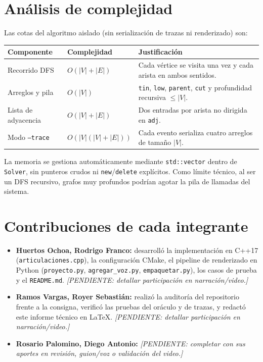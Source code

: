 \documentclass[11pt,a4paper]{article}
\begin{document}
\section{Análisis de complejidad}
Las cotas del algoritmo aislado (sin serialización de trazas ni renderizado) son:

\begin{center}
\begin{tabular}{@{}lll@{}}
\toprule
Componente & Complejidad & Justificación \\
\midrule
Recorrido DFS & $O(|V| + |E|)$ & Cada vértice se visita una vez y cada arista en ambos sentidos. \\
Arreglos y pila & $O(|V|)$ & \texttt{tin}, \texttt{low}, \texttt{parent}, \texttt{cut} y profundidad recursiva $\le |V|$. \\
Lista de adyacencia & $O(|V| + |E|)$ & Dos entradas por arista no dirigida en \texttt{adj}. \\
Modo \texttt{--trace} & $O(|V|(|V| + |E|))$ & Cada evento serializa cuatro arreglos de tamaño $|V|$. \\
\bottomrule
\end{tabular}
\end{center}

La memoria se gestiona automáticamente mediante \texttt{std::vector} dentro de
\texttt{Solver}, sin punteros crudos ni \texttt{new}/\texttt{delete} explícitos.
Como límite técnico, al ser un DFS recursivo, grafos muy profundos podrían
agotar la pila de llamadas del sistema.

\section{Contribuciones de cada integrante}
\begin{itemize}
  \item \textbf{Huertos Ochoa, Rodrigo Franco:} desarrolló la implementación en
    C++17 (\texttt{articulaciones.cpp}), la configuración CMake, el pipeline de
    renderizado en Python (\texttt{proyecto.py}, \texttt{agregar\_voz.py},
    \texttt{empaquetar.py}), los casos de prueba y el \texttt{README.md}.
    \emph{[PENDIENTE: detallar participación en narración/video.]}
  \item \textbf{Ramos Vargas, Royer Sebastián:} realizó la auditoría del
    repositorio frente a la consigna, verificó las pruebas del oráculo y de
    trazas, y redactó este informe técnico en \LaTeX.
    \emph{[PENDIENTE: detallar participación en narración/video.]}
  \item \textbf{Rosario Palomino, Diego Antonio:} \emph{[PENDIENTE: completar
    con sus aportes en revisión, guion/voz o validación del video.]}
\end{itemize}
\end{document}
